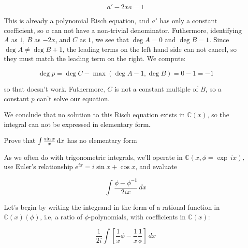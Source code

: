 $$a' - 2x a = 1$$

This is already a polynomial Risch equation, and $a'$ has only
a constant coefficient, so $a$ can not have a non-trivial denominator.
Futhermore, identifying $A$ as $1$, $B$ as $-2x$, and $C$ as $1$,
we see that $\deg A = 0$ and $\deg B = 1$.  Since $\deg A \ne \deg B + 1$,
the leading terms on the left hand side can not cancel,
so they must match the leading term on the right.
We compute:

$$\deg p = \deg C - \max(\deg A - 1, \deg B) = 0 - 1 = -1$$

so that doesn't work.  Futhermore, $C$ is not a constant
multiple of $B$, so a constant $p$ can't solve our equation.

We conclude that no solution to this Risch equation exists in ${\mathbb C}(x)$,
so the integral can not be expressed in elementary form.

\endexample


\example Prove that $\int \frac{\sin x}{x} \, {\rm d}x$ has no elementary form

As we often do with trigonometric integrals, we'll operate in
${\mathbb C}(x, \phi = \exp \,ix)$, use Euler's relationship
$e^{ix}=i\sin x + \cos x$, and evaluate

$$\int \frac{\phi - \phi^{-1}}{2ix} \,dx$$

Let's begin by writing the integrand in the form of a rational
function in ${\mathbb C}(x)(\phi)$, i.e, a ratio
of $\phi$-polynomials, with coefficients in ${\mathbb C}(x)$:

$$\frac{1}{2i} \int \left[ \frac{1}{x}\phi - \frac{1}{x}\frac{1}{\phi} \right]\,dx$$

\begin{comment}
We want to split the denominator into its normal and special
components, by factoring it into irreducible polynomials and
classifying each one as normal or special.  In this case, the
factoriziation is trivial, and we know from theorem \ref{basic
exponential properties} that $\phi$ is special.

Can we have any logarithms in our integral?  Let's see.
Any logarithm of a rational function can be factored and
split into separate logarithms using basic properties
of a logarithms:

$$\ln ab = \ln a + \ln b \qquad\qquad \ln\frac{a}{b} = \ln a - \ln b$$

So, we need only consider logarithms of irreducible polynomials.

Theorem \ref{basic exponential properties} also tells us that we can
have no normal polynomials in denominator of our integral,
\end{comment}


